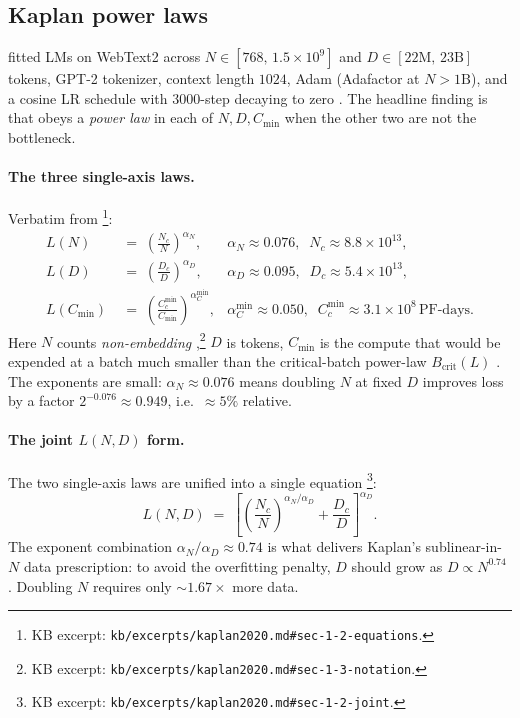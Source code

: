 \subsection{Kaplan power laws}
\label{sec:scaling-kaplan}

\citet{kaplan2020} fitted   LMs on WebText2
across $N \in [768,\, 1.5 \times 10^9]$  and
$D \in [22\text{M},\, 23\text{B}]$ tokens, GPT-2  tokenizer,
context length $1024$, Adam (Adafactor at $N > 1\text{B}$), and a
cosine LR schedule with $3000$-step  decaying to zero
\citep[\S 2.2]{kaplan2020}. The headline finding is that
 obeys a \emph{power law} in each of $N, D, C_{\min}$
when the other two are not the bottleneck.

\paragraph{The three single-axis laws.}
Verbatim from \citet[\S 1.2, eqs.\ 1.1--1.3]{kaplan2020}\footnote{KB
excerpt: \nolinkurl{kb/excerpts/kaplan2020.md#sec-1-2-equations}.}:
\begin{align}
L(N) &\;=\; \left(\frac{N_c}{N}\right)^{\alpha_N},
   & \alpha_N \approx 0.076,\;\; N_c \approx 8.8 \times 10^{13}, \tag{1.1} \\
L(D) &\;=\; \left(\frac{D_c}{D}\right)^{\alpha_D},
   & \alpha_D \approx 0.095,\;\; D_c \approx 5.4 \times 10^{13}, \tag{1.2} \\
L(C_{\min}) &\;=\; \left(\frac{C_c^{\min}}{C_{\min}}\right)^{\alpha_C^{\min}},
   & \alpha_C^{\min} \approx 0.050,\;\; C_c^{\min} \approx 3.1 \times 10^{8}\,\text{PF-days}. \tag{1.3}
\end{align}
Here $N$ counts \emph{non-embedding} 
\citep[\S 1.3]{kaplan2020},\footnote{KB excerpt:
\nolinkurl{kb/excerpts/kaplan2020.md#sec-1-3-notation}.}
$D$ is tokens, $C_{\min}$ is the compute that would be expended at a
batch much smaller than the critical-batch power-law $B_{\text{crit}}(L)$
\citep[\S 5.1]{kaplan2020}. The exponents are small: $\alpha_N \approx
0.076$ means doubling $N$ at fixed $D$ improves loss by a factor
$2^{-0.076} \approx 0.949$, i.e.\ $\approx 5\%$ relative.

\paragraph{The joint $L(N, D)$ form.}
The two single-axis laws are unified into a single equation
\citep[\S 1.2, eq.\ 1.5]{kaplan2020}\footnote{KB excerpt:
\nolinkurl{kb/excerpts/kaplan2020.md#sec-1-2-joint}.}:
\begin{equation}
L(N, D) \;=\; \left[\left(\frac{N_c}{N}\right)^{\alpha_N/\alpha_D} + \frac{D_c}{D}\right]^{\alpha_D}.
\label{eq:kaplan-joint}
\tag{1.5}
\end{equation}
The exponent combination $\alpha_N/\alpha_D \approx 0.74$ is what
delivers Kaplan's sublinear-in-$N$ data prescription: to avoid the
overfitting penalty, $D$ should grow as $D \propto N^{0.74}$
\citep[\S 1.2]{kaplan2020}. Doubling $N$ requires only $\sim 1.67\times$
more data.

